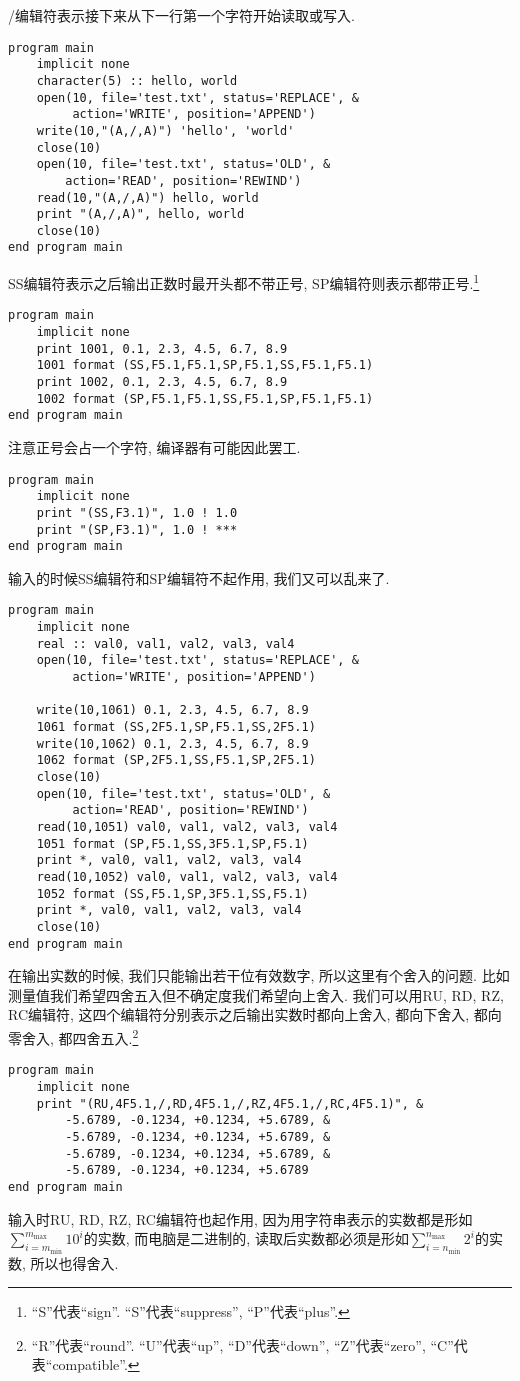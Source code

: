 /编辑符表示接下来从下一行第一个字符开始读取或写入.
\begin{lstlisting}
program main
    implicit none
    character(5) :: hello, world
    open(10, file='test.txt', status='REPLACE', &
         action='WRITE', position='APPEND')
    write(10,"(A,/,A)") 'hello', 'world'
    close(10)
    open(10, file='test.txt', status='OLD', &
        action='READ', position='REWIND')
    read(10,"(A,/,A)") hello, world
    print "(A,/,A)", hello, world
    close(10)
end program main
\end{lstlisting}

SS编辑符表示之后输出正数时最开头都不带正号, SP编辑符则表示都带正号.\footnote{``S''代表``sign''. ``S''代表``suppress'', ``P''代表``plus''.}
\begin{lstlisting}
program main
    implicit none
    print 1001, 0.1, 2.3, 4.5, 6.7, 8.9
    1001 format (SS,F5.1,F5.1,SP,F5.1,SS,F5.1,F5.1)
    print 1002, 0.1, 2.3, 4.5, 6.7, 8.9
    1002 format (SP,F5.1,F5.1,SS,F5.1,SP,F5.1,F5.1)
end program main
\end{lstlisting}
注意正号会占一个字符, 编译器有可能因此罢工.
\begin{lstlisting}
program main
    implicit none
    print "(SS,F3.1)", 1.0 ! 1.0
    print "(SP,F3.1)", 1.0 ! ***
end program main
\end{lstlisting}
输入的时候SS编辑符和SP编辑符不起作用, 我们又可以乱来了.
\begin{lstlisting}
program main
    implicit none
    real :: val0, val1, val2, val3, val4
    open(10, file='test.txt', status='REPLACE', &
         action='WRITE', position='APPEND')

    write(10,1061) 0.1, 2.3, 4.5, 6.7, 8.9
    1061 format (SS,2F5.1,SP,F5.1,SS,2F5.1)
    write(10,1062) 0.1, 2.3, 4.5, 6.7, 8.9
    1062 format (SP,2F5.1,SS,F5.1,SP,2F5.1)
    close(10)
    open(10, file='test.txt', status='OLD', &
         action='READ', position='REWIND')
    read(10,1051) val0, val1, val2, val3, val4
    1051 format (SP,F5.1,SS,3F5.1,SP,F5.1)
    print *, val0, val1, val2, val3, val4
    read(10,1052) val0, val1, val2, val3, val4
    1052 format (SS,F5.1,SP,3F5.1,SS,F5.1)
    print *, val0, val1, val2, val3, val4
    close(10)
end program main
\end{lstlisting}

在输出实数的时候, 我们只能输出若干位有效数字, 所以这里有个舍入的问题. 比如测量值我们希望四舍五入但不确定度我们希望向上舍入. 我们可以用RU, RD, RZ, RC编辑符, 这四个编辑符分别表示之后输出实数时都向上舍入, 都向下舍入, 都向零舍入, 都四舍五入.\footnote{``R''代表``round''. ``U''代表``up'', ``D''代表``down'', ``Z''代表``zero'', ``C''代表``compatible''.}
\begin{lstlisting}
program main
    implicit none
    print "(RU,4F5.1,/,RD,4F5.1,/,RZ,4F5.1,/,RC,4F5.1)", &
        -5.6789, -0.1234, +0.1234, +5.6789, &
        -5.6789, -0.1234, +0.1234, +5.6789, &
        -5.6789, -0.1234, +0.1234, +5.6789, &
        -5.6789, -0.1234, +0.1234, +5.6789
end program main
\end{lstlisting}
输入时RU, RD, RZ, RC编辑符也起作用, 因为用字符串表示的实数都是形如$\sum_{i=m_\text{min}}^{m_\text{max}}10^{i}$的实数, 而电脑是二进制的, 读取后实数都必须是形如$\sum_{i=n_\text{min}}^{n_\text{max}}2^{i}$的实数, 所以也得舍入.

